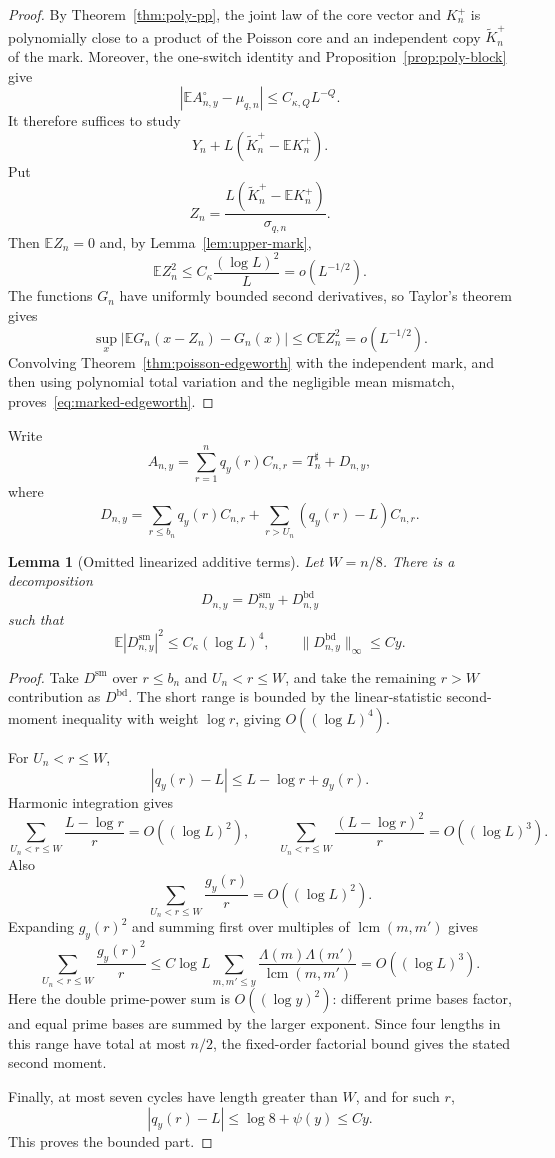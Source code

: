 \documentclass[11pt]{article}
\newtheorem{lemma}[theorem]{Lemma}
\theoremstyle{remark}
\newcommand{\Ee}{\mathbb E}
\newcommand{\lcm}{\operatorname{lcm}}
\begin{document}
\begin{proof}
By Theorem~\ref{thm:poly-pp}, the joint law of the core vector and $K_n^+$
is polynomially close to a product of the Poisson core and an independent
copy $\widetilde K_n^+$ of the mark.  Moreover, the one-switch identity and
Proposition~\ref{prop:poly-block} give
\[
 |\Ee A_{n,y}^\circ-\mu_{q,n}|\le C_{\kappa,Q}L^{-Q}.
\]
It therefore suffices to study
\[
 Y_n+L(\widetilde K_n^+-\Ee K_n^+).
\]
Put
\[
 Z_n=\frac{L(\widetilde K_n^+-\Ee K_n^+)}{\sigma_{q,n}}.
\]
Then $\Ee Z_n=0$ and, by Lemma~\ref{lem:upper-mark},
\[
 \Ee Z_n^2\le C_\kappa\frac{(\log L)^2}{L}=o(L^{-1/2}).
\]
The functions $G_n$ have uniformly bounded second derivatives, so Taylor's
theorem gives
\[
 \sup_x|\Ee G_n(x-Z_n)-G_n(x)|\le C\Ee Z_n^2=o(L^{-1/2}).
\]
Convolving Theorem~\ref{thm:poisson-edgeworth} with the independent mark,
and then using polynomial total variation and the negligible mean mismatch,
proves~\eqref{eq:marked-edgeworth}.
\end{proof}

Write
\[
 A_{n,y}=\sum_{r=1}^nq_y(r)C_{n,r}=T_n^\sharp+D_{n,y},
\]
where
\[
 D_{n,y}=\sum_{r\le b_n}q_y(r)C_{n,r}
 +\sum_{r>U_n}(q_y(r)-L)C_{n,r}.
\]

\begin{lemma}[Omitted linearized additive terms]
\label{lem:omitted-linearized}
Let $W=n/8$.  There is a decomposition
\[
 D_{n,y}=D_{n,y}^{\mathrm{sm}}+D_{n,y}^{\mathrm{bd}}
\]
such that
\[
 \Ee|D_{n,y}^{\mathrm{sm}}|^2\le C_\kappa(\log L)^4,
 \qquad
 \|D_{n,y}^{\mathrm{bd}}\|_\infty\le C y.
\]
\end{lemma}

\begin{proof}
Take $D^{\mathrm{sm}}$ over $r\le b_n$ and $U_n<r\le W$, and take the
remaining $r>W$ contribution as $D^{\mathrm{bd}}$.  The short range is
bounded by the linear-statistic second-moment inequality with weight
$\log r$, giving $O((\log L)^4)$.

For $U_n<r\le W$,
\[
 |q_y(r)-L|\le L-\log r+g_y(r).
\]
Harmonic integration gives
\[
 \sum_{U_n<r\le W}\frac{L-\log r}{r}=O((\log L)^2),
 \qquad
 \sum_{U_n<r\le W}\frac{(L-\log r)^2}{r}=O((\log L)^3).
\]
Also
\[
 \sum_{U_n<r\le W}\frac{g_y(r)}r=O((\log L)^2).
\]
Expanding $g_y(r)^2$ and summing first over multiples of
$\lcm(m,m')$ gives
\[
 \sum_{U_n<r\le W}\frac{g_y(r)^2}{r}
 \le C\log L
 \sum_{m,m'\le y}\frac{\Lambda(m)\Lambda(m')}{\lcm(m,m')}
 =O((\log L)^3).
\]
Here the double prime-power sum is $O((\log y)^2)$: different prime bases
factor, and equal prime bases are summed by the larger exponent.  Since four
lengths in this range have total at most $n/2$, the fixed-order factorial
bound gives the stated second moment.

Finally, at most seven cycles have length greater than $W$, and for such
$r$,
\[
 |q_y(r)-L|\le\log8+\psi(y)\le Cy.
\]
This proves the bounded part.
\end{proof}
\end{document}
